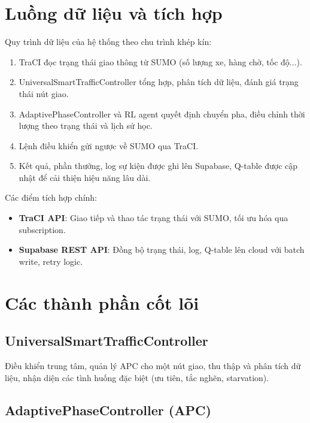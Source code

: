 \section{Luồng dữ liệu và tích hợp}

Quy trình dữ liệu của hệ thống theo chu trình khép kín:
\begin{enumerate}
    \item TraCI đọc trạng thái giao thông từ SUMO (số lượng xe, hàng chờ, tốc độ...).
    \item UniversalSmartTrafficController tổng hợp, phân tích dữ liệu, đánh giá trạng thái nút giao.
    \item AdaptivePhaseController và RL agent quyết định chuyển pha, điều chỉnh thời lượng theo trạng thái và lịch sử học.
    \item Lệnh điều khiển gửi ngược về SUMO qua TraCI.
    \item Kết quả, phần thưởng, log sự kiện được ghi lên Supabase, Q-table được cập nhật để cải thiện hiệu năng lâu dài.
\end{enumerate}

Các điểm tích hợp chính:
\begin{itemize}
    \item \textbf{TraCI API}: Giao tiếp và thao tác trạng thái với SUMO, tối ưu hóa qua subscription.
    \item \textbf{Supabase REST API}: Đồng bộ trạng thái, log, Q-table lên cloud với batch write, retry logic.
\end{itemize}

\section{Các thành phần cốt lõi}

\subsection{UniversalSmartTrafficController}

Điều khiển trung tâm, quản lý APC cho một nút giao, thu thập và phân tích dữ liệu, nhận diện các tình huống đặc biệt (ưu tiên, tắc nghẽn, starvation).

\subsection{AdaptivePhaseController (APC)}

